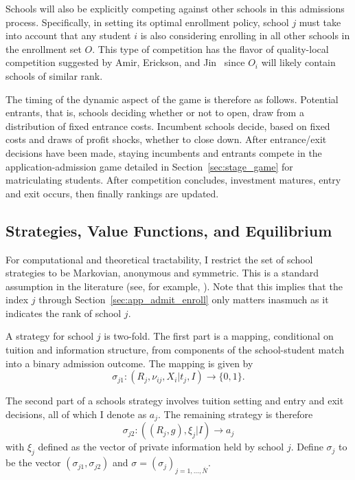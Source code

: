 \documentclass[12pt]{article}
\theoremstyle{definition}
\begin{document}
Schools will also be explicitly competing against other schools in this admissions process. Specifically, in setting its optimal enrollment policy, school $j$ must take into account that any student $i$ is also considering enrolling in all other schools in the enrollment set $O$. This type of competition has the flavor of quality-local competition suggested by Amir, Erickson, and Jin~\cite{AmirEricksonJin} since $O_i$ will likely contain schools of similar rank.

The timing of the dynamic aspect of the game is therefore as follows. Potential entrants, that is, schools deciding whether or not to open, draw from a distribution of fixed entrance costs. Incumbent schools decide, based on fixed costs and draws of profit shocks, whether to close down. After entrance/exit decisions have been made, staying incumbents and entrants compete in the application-admission game detailed in Section~\ref{sec:stage_game} for matriculating students. After competition concludes, investment matures, entry and exit occurs, then finally rankings are updated.

\subsection{Strategies, Value Functions, and Equilibrium}
\label{sec:strat_val_eqbm}

For computational and theoretical tractability, I restrict the set of school strategies to be Markovian, anonymous and symmetric. This is a standard assumption in the literature (see, for example, \cite{MaskinTirole}\cite{EricsonPakes}\cite{DoraSatter}\cite{Ryan}). Note that this implies that the index $j$ through Section~\ref{sec:app_admit_enroll} only matters inasmuch as it indicates the rank of school $j$.

A strategy for school $j$ is two-fold. The first part is a mapping, conditional on tuition and information structure, from components of the school-student match into a binary admission outcome. The mapping is given by
\begin{equation}
  \sigma_{j1}: (R_j, \nu_{ij}, X_i | t_j, I) \rightarrow \{0, 1\}.
\end{equation}

The second part of a schools strategy involves tuition setting and entry and exit decisions, all of which I denote as $a_j$. The remaining strategy is therefore
\begin{equation}
  \sigma_{j2}: ((R_j, g), \xi_j|I) \rightarrow a_j
\end{equation}
with $\xi_j$ defined as the vector of private information held by school $j$. Define $\sigma_j$ to be the vector $(\sigma_{j1}, \sigma_{j2})$ and $\sigma = (\sigma_j)_{j=1, \dots, \overline{N}}$.
\end{document}
